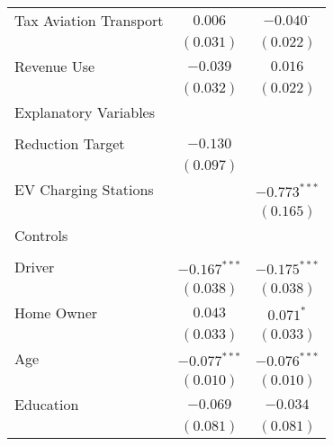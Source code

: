 \begin{center}
\begin{tiny}
\begin{longtable}{l@{} c@{} c@{}}
\quad Tax Aviation Transport                           & $0.006$          & $-0.040^{\cdot}$ \\
                                                       & $(0.031)$        & $(0.022)$        \\
\quad Revenue Use                                      & $-0.039$         & $0.016$          \\
                                                       & $(0.032)$        & $(0.022)$        \\
Explanatory Variables                                  &                  &                  \\
                                                       &                  &                  \\
\quad Reduction Target                                 & $-0.130$         &                  \\
                                                       & $(0.097)$        &                  \\
\quad EV Charging Stations                             &                  & $-0.773^{***}$   \\
                                                       &                  & $(0.165)$        \\
Controls                                               &                  &                  \\
                                                       &                  &                  \\
\quad Driver                                           & $-0.167^{***}$   & $-0.175^{***}$   \\
                                                       & $(0.038)$        & $(0.038)$        \\
\quad Home Owner                                       & $0.043$          & $0.071^{*}$      \\
                                                       & $(0.033)$        & $(0.033)$        \\
\quad Age                                              & $-0.077^{***}$   & $-0.076^{***}$   \\
                                                       & $(0.010)$        & $(0.010)$        \\
\quad Education                                        & $-0.069$         & $-0.034$         \\
                                                       & $(0.081)$        & $(0.081)$        \\

\end{longtable}
\end{tiny}
\end{center}
